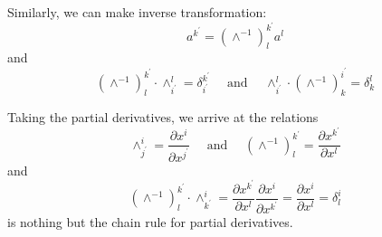Similarly, we can make inverse transformation:
$$
a^{k^{\prime}}=\left(\wedge^{-1}\right)_{l}^{k^{\prime}} a^{l}
$$
and
\[
\left(\wedge^{-1}\right)_{l}^{k^{\prime}} \cdot \wedge_{i^{\prime}}^{l}=\delta_{i^{\prime}}^{k^{\prime}} \quad \text { and } \quad \wedge_{i^{\prime}}^{l} \cdot\left(\wedge^{-1}\right)_{k}^{i^{\prime}}=\delta_{k}^{l}
\]
\begin{qt}
Taking the partial derivatives, we arrive at the relations
\[
\wedge_{j^{\prime}}^{i}=\frac{\partial x^{i}}{\partial x^{j^{\prime}}} \quad \text { and } \quad\left(\wedge^{-1}\right)_{l}^{k^{\prime}}=\frac{\partial x^{k^{\prime}}}{\partial x^{l}}
\]
and
$$
\left(\wedge^{-1}\right)_{l}^{k^{\prime}} \cdot \wedge_{k^{\prime}}^{i}=\frac{\partial x^{k^{\prime}}}{\partial x^{l}} \frac{\partial x^{i}}{\partial x^{k^{\prime}}}=\frac{\partial x^{i}}{\partial x^{l}}=\delta_{l}^{i}
$$
is nothing but the chain rule for partial derivatives.
\end{qt}

